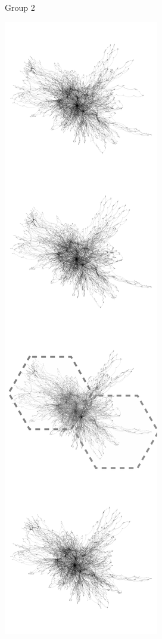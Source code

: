 \begin{figure}[H]
\begin{subfigure}[b]{.2\textwidth}
     \caption{Group 2}
     \end{subfigure}
     \begin{subfigure}[b]{.2\textwidth}
         \centering
     \includegraphics[width=\textwidth]{figures_c1/beijingtest/3.png}

\end{subfigure}
\end{figure}
